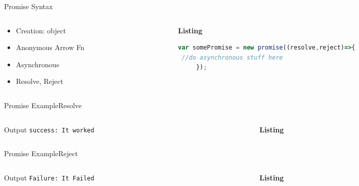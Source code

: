 \documentclass[pdf,table]{beamer}
\begin{document}
\begin{frame}[fragile]{Promise Syntax\cite{mead:2018}}%
	\begin{columns}[T]
		\begin{column}{0.48\textwidth}
			\begin{itemize}
				\item<1-> Creation: object
				\item<2-> Anonymous Arrow Fn
				\item<3-> Asynchronous
				\item<4-> Resolve, Reject
			\end{itemize}
		\end{column}
		\begin{column}{0.48\textwidth}
			{\bf Listing}
			\begin{lstlisting}[language=JavaScript]
 var somePromise = new promise((resolve,reject)=>{
 //do asynchronous stuff here
	 });
			\end{lstlisting}
		\end{column}
	\end{columns}	
\end{frame}




\begin{frame}{Promise Example}{Resolve}
	\begin{columns}[T]
		\begin{column}{0.35\textwidth}
			\begin{block}{Output}
				{\tt success: It worked}
			\end{block}
		\end{column}
		\begin{column}{0.55\textwidth}
			{\bf Listing}
			
		\end{column}
	\end{columns}	
\end{frame}

\begin{frame}{Promise Example}{Reject}
	\begin{columns}[T]
		\begin{column}{0.35\textwidth}
			\begin{block}{Output}
				{\tt Failure: It Failed}
			\end{block}
		\end{column}
		\begin{column}{0.55\textwidth}
			{\bf Listing}
			
		\end{column}
	\end{columns}	
\end{frame}
\end{document}
